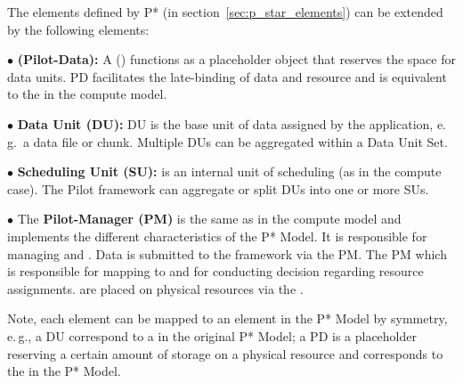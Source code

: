 \documentclass{sig-alternate}
\begin{document}

The elements defined by P* (in section~\ref{sec:p_star_elements}) can
be extended by the following elements:


\noindent$\bullet$
  \textbf{\pilot (Pilot-Data):} A \pilotdata (\pd) functions as a 
	placeholder object that reserves the space
	for data units. PD facilitates the late-binding of data and resource and is
	equivalent to the \pilot in the compute model.

\noindent$\bullet$
  \textbf{Data Unit (DU):} DU is the base unit of data assigned by
  the application,  e.\,g.\ a data file or chunk. Multiple DUs can be aggregated 
   within a Data Unit Set.


\noindent$\bullet$
  \textbf{Scheduling Unit (SU):} is an internal unit of scheduling (as in 
  the compute case). The Pilot framework can aggregate or split DUs into one 
  or more SUs.

\noindent$\bullet$ 
  The \textbf{Pilot-Manager (PM)} is the same as in the compute model and
  implements the different characteristics of the P* Model. It is responsible for
  managing \dus and \sus. Data is submitted to the framework via the PM. The PM
  which is responsible for mapping \dus to \sus and for conducting decision 
  regarding resource assignments. \sus are placed on physical resources via the \pilot.

Note, each element can be mapped to an element in the P* Model by
symmetry, e.\,g., a DU correspond to a \cu  in the original P* Model; 
a PD is a placeholder reserving a certain amount of storage on a physical 
resource and corresponds to the \pilot in the P* Model.


\end{document}
